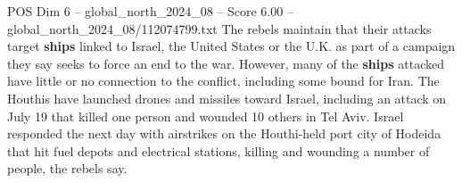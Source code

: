 \begin{textsample}{POS Dim 6 – global\_north\_2024\_08 – Score 6.00 – global\_north\_2024\_08/112074799.txt}
The rebels maintain that their attacks target \textbf{ships} linked to Israel, the United States or the U.K. as part of a campaign they say seeks to force an end to the war.
However, many of the \textbf{ships} attacked have little or no connection to the conflict, including some bound for Iran.
The Houthis have launched drones and missiles toward Israel, including an attack on July 19 that killed one person and wounded 10 others in Tel Aviv.
Israel responded the next day with airstrikes on the Houthi-held port city of Hodeida that hit fuel depots and electrical stations, killing and wounding a number of people, the rebels say.

\end{textsample}
